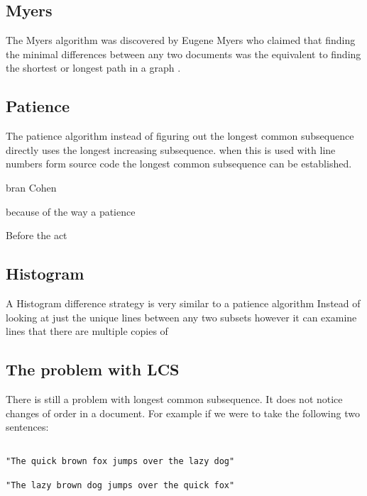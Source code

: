 \subsection{Myers}
The Myers algorithm was discovered by Eugene Myers who claimed that finding the minimal differences between any two documents was the equivalent to finding the shortest or longest path in a graph \cite{Myers1986}.

\subsection{Patience}
The patience algorithm instead of figuring out the longest common subsequence directly uses the longest increasing subsequence.
when this is used with line numbers form source code the longest common subsequence can be established.

bran Cohen

because of the way a patience 

Before the act

\subsection{Histogram}
A Histogram difference strategy is very similar to a patience algorithm
Instead of looking at just the unique lines between any two subsets however it can examine lines that there are multiple copies of 

\subsection{The problem with LCS}
There is still a problem with longest common subsequence. It does not notice changes of order in a document.  For example if we were to take the following two sentences:

\begin{verbatim}

"The quick brown fox jumps over the lazy dog"

"The lazy brown dog jumps over the quick fox"

\end{verbatim}

